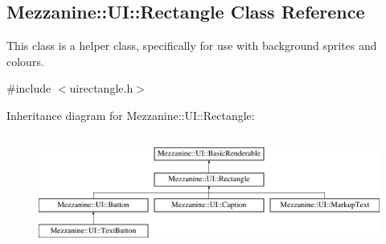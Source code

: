 \hypertarget{classMezzanine_1_1UI_1_1Rectangle}{
\subsection{Mezzanine::UI::Rectangle Class Reference}
\label{classMezzanine_1_1UI_1_1Rectangle}
}


This class is a helper class, specifically for use with background sprites and colours.  




{\ttfamily \#include $<$uirectangle.h$>$}

Inheritance diagram for Mezzanine::UI::Rectangle:\begin{figure}[H]
\begin{center}
\leavevmode
\includegraphics[height=3.733333cm]{classMezzanine_1_1UI_1_1Rectangle}
\end{center}
\end{figure}
